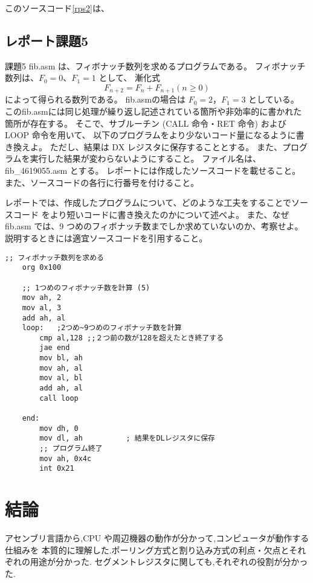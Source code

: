\documentclass[12pt]{jarticle}
\begin{document}
このソースコード\ref{rps2}は、

\subsection{レポート課題5}
\begin{itembox}[l]{課題5}
	fib.asm は、フィボナッチ数列を求めるプログラムである。
	フィボナッチ数列は、$F_0 = 0$、$F_1 = 1$ として、
	漸化式
	$$F_{n+2} = F_n + F_{n+1}  (n \geq 0)$$
	によって得られる数列である。
	fib.asmの場合は $F_0 = 2$，$F_1 = 3$ としている。
	このfib.asmには同じ処理が繰り返し記述されている箇所や非効率的に書かれた箇所が存在する。
	そこで、サブルーチン (CALL 命令・RET 命令) および LOOP 命令を用いて、
	以下のプログラムをより少ないコード量になるように書き換えよ。
	ただし、結果は DX レジスタに保存することとする。
	また、プログラムを実行した結果が変わらないようにすること。
	ファイル名は、fib\_4619055.asm とする。
	レポートには作成したソースコードを載せること。
	また、ソースコードの各行に行番号を付けること。

	レポートでは、作成したプログラムについて、どのような工夫をすることでソースコード
	をより短いコードに書き換えたのかについて述べよ。
	また、なぜ fib.asm では、9 つめのフィボナッチ数までしか求めていないのか、考察せよ。
	説明するときには適宜ソースコードを引用すること。
\end{itembox}

\begin{lstlisting}[caption=fib\_4619055.asm,label=fib]
	;; フィボナッチ数列を求める
	org 0x100
	 
	;; 1つめのフィボナッチ数を計算 (5)
	mov ah, 2
	mov al, 3
	add ah, al
	loop:   ;2つめ~9つめのフィボナッチ数を計算
		cmp al,128 ;;２つ前の数が128を超えたとき終了する
		jae end
		mov bl, ah
		mov ah, al
		mov al, bl
		add ah, al
		call loop
	 
	end:
		mov dh, 0
		mov dl, ah          ; 結果をDLレジスタに保存
		;; プログラム終了
		mov ah, 0x4c
		int 0x21
\end{lstlisting}


\section{結論}
アセンブリ言語から,CPU や周辺機器の動作が分かって,コンピュータが動作する仕組みを
本質的に理解した.ポーリング方式と割り込み方式の利点・欠点とそれぞれの用途が分かった.
セグメントレジスタに関しても,それぞれの役割が分かった.
\end{document}

